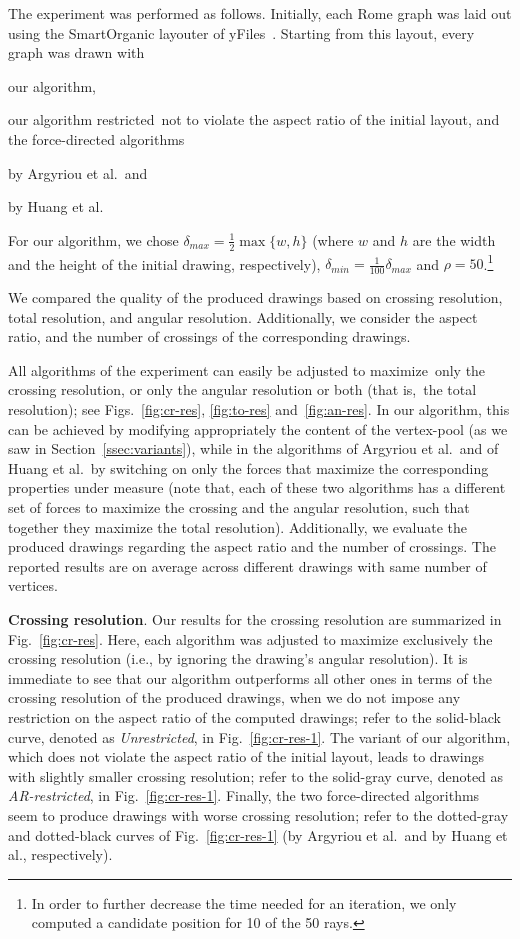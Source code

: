 \documentclass[runningheads]{llncs}
\newcommand{\myparagraph}[1]{\smallskip\noindent\textbf{#1}.}
\begin{document}
The experiment was performed as follows. Initially, each Rome graph was laid out using the SmartOrganic layouter of yFiles~\cite{DBLP:books/sp/04/WieseE004}. Starting from this layout, every graph was drawn with
\begin{inparaenum}[(i)]
\item our algorithm,
\item our algorithm restricted~not to violate the aspect ratio of the initial layout, and the force-directed algorithms
\item by Argyriou et al.\ and
\item by Huang et al.
\end{inparaenum}
For our algorithm, we chose $\delta_{max}=\frac{1}{2}\max\{w,h\}$ (where $w$ and $h$ are the width and the height of the initial drawing, respectively), $\delta_{min}=\frac{1}{100}\delta_{max}$ and $\rho=50$.\footnote{In order to further decrease the time needed for an iteration, we only computed a candidate position for 10 of the 50 rays.} 

We compared the quality of the produced drawings based on crossing resolution, total resolution, and angular resolution. Additionally, we consider the aspect ratio, and the number of crossings of the corresponding drawings.

All algorithms of the experiment can easily be adjusted to maximize~only the crossing resolution, or only the angular resolution or both (that is,~the total resolution); see Figs.~\ref{fig:cr-res}, \ref{fig:to-res} and~\ref{fig:an-res}. In our algorithm, this can be achieved by modifying appropriately the content of the vertex-pool (as we saw in Section~\ref{ssec:variants}), while in the algorithms of Argyriou et al.\ and of Huang et al.\ by switching on only the forces that maximize the corresponding properties under measure (note that, each of these two algorithms has a different set of forces to maximize the crossing and the angular resolution, such that together they maximize the total resolution). Additionally, we evaluate the produced drawings regarding the aspect ratio and the number of crossings. The reported results are on average across different drawings with same number of vertices.

\myparagraph{Crossing resolution} Our results for the crossing resolution are summarized in Fig.~\ref{fig:cr-res}. Here, each algorithm was adjusted to maximize exclusively the crossing resolution (i.e., by ignoring the drawing's angular resolution). It is immediate to see that our algorithm outperforms all other ones in terms of the crossing resolution of the produced drawings, when we do not impose any restriction on the aspect ratio of the computed drawings; refer to the solid-black curve, denoted as \emph{Unrestricted}, in Fig.~\ref{fig:cr-res-1}. The variant of our algorithm, which does not violate the aspect ratio of the initial layout, leads to drawings with slightly smaller crossing resolution; refer to the solid-gray curve, denoted as \emph{AR-restricted}, in Fig.~\ref{fig:cr-res-1}. Finally, the two force-directed algorithms seem to produce drawings with worse crossing resolution; refer to the dotted-gray and dotted-black curves of Fig.~\ref{fig:cr-res-1} (by Argyriou et al.\ and by Huang et al., respectively).
\end{document}
